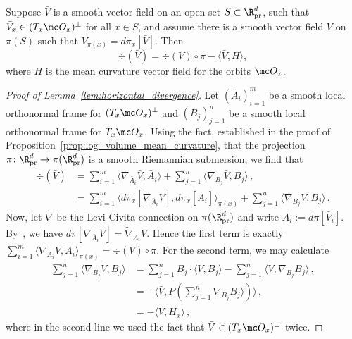 \documentclass[twoside,a4paper,11pt]{article}
\newcommand{\pr}{\mathrm{pr}}
\theoremstyle{plain}
\begin{document}
\begin{lemma}\label{lem:horizontal_divergence} Suppose
$\bar V$ is a smooth
vector field on an open set $S \subset \R^d_{\pr}$,
such that $\bar V_x \in (T_x\mc O_x)^{\perp}$ for all $x \in S$,
and assume there is 
a smooth vector field $V$ on
$\pi(S)$ such that $V_{\pi(x)}
= d\pi_x[\bar V]$.
Then
$$
\div(\bar V) = \div(V)\circ \pi 
- \langle \bar V, H\rangle,
$$ where $H$ is the mean curvature
vector field for the orbits $\mc O_x$.
\end{lemma}

\begin{proof}[Proof of Lemma~\ref{lem:horizontal_divergence}]
    Let $(\bar A_i)_{i = 1}^m$ be 
    a smooth local orthonormal frame for $(T_x \mc O_x)^\perp$ and $(B_j)_{j = 1}^n$ be a smooth local orthonormal frame for $T_x \mc O_x$.
    Using the fact, established in the proof of Proposition~\ref{prop:log_volume_mean_curvature},
    that the projection $\pi \colon \R^d_{\pr}
    \to \pi(\R^d_{\pr})$ is a smooth Riemannian
    submersion, we find that
    \begin{align*}
        \div(\bar{V}) & = \sum_{i =1 }^m \langle \nabla_{\bar{A}_i} \bar{V}, \bar{A}_i \rangle + \sum_{j = 1}^n \langle \nabla_{B_j} \bar{V}, B_j \rangle \, , \\
        & = \sum_{i = 1}^m \langle d \pi_x [\nabla_{\bar{A}_i} \bar{V}], d \pi_x[\bar{A}_i] \rangle_{\pi(x)} + \sum_{j=1}^n \langle \nabla_{B_j} \bar{V}, B_j\rangle \, .
    \end{align*}
    Now, let $\tilde{\nabla}$ be the Levi-Civita connection on $\pi(\R^d_\pr)$
    and write $A_i := d\pi[\bar V_i]$.
    By~\cite[Problem 5-6(b)]{lee2018introduction},
   we have $d \pi [\nabla_{\bar{A}_i} \bar{V}] = \tilde{\nabla}_{A_i} V$.
   Hence the first term is exactly $\sum_{i = 1}^m \langle \tilde{\nabla}_{A_i} V, A_i \rangle_{\pi(x)} = \div(V)\circ \pi$. For the second term, we 
   may calculate
    \begin{align*}
        \sum_{j = 1}^n \langle \nabla_{B_j} \bar{V}, B_j \rangle & = \sum_{j= 1}^n  B_j \cdot \langle \bar{V}, B_j \rangle - \sum_{j = 1}^n \langle \bar{V}, \nabla_{B_j} B_j \rangle  \, , \\
        & = - \langle \bar{V}, P(\sum_{j=1}^n \nabla_{B_j} B_j \rangle) \rangle \, , \\
        & = - \langle \bar{V}, H_x \rangle \, ,
    \end{align*}
    where in the second line we used the fact that 
    $\bar V \in (T_x \mc O_x)^{\perp}$ twice.
\end{proof}
\end{document}
